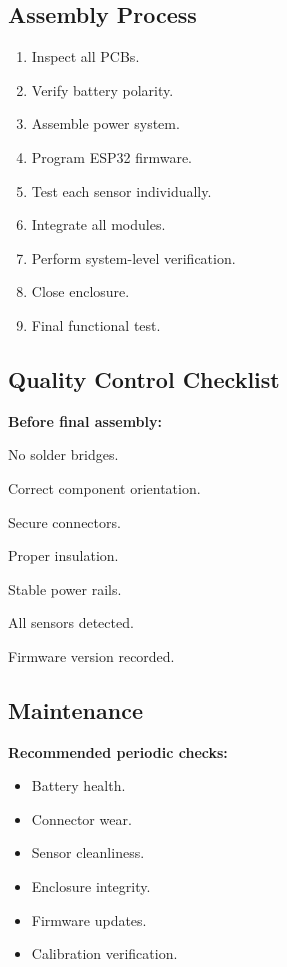 \subsection{Assembly Process}
\label{sec:assembly-process}

\begin{enumerate}
    \item Inspect all PCBs.
    \item Verify battery polarity.
    \item Assemble power system.
    \item Program ESP32 firmware.
    \item Test each sensor individually.
    \item Integrate all modules.
    \item Perform system-level verification.
    \item Close enclosure.
    \item Final functional test.
\end{enumerate}

\subsection{Quality Control Checklist}
\label{sec:qc-checklist}

\textbf{Before final assembly:}
\begin{checklist}
    \item No solder bridges.
    \item Correct component orientation.
    \item Secure connectors.
    \item Proper insulation.
    \item Stable power rails.
    \item All sensors detected.
    \item Firmware version recorded.
\end{checklist}

\subsection{Maintenance}
\label{sec:maintenance}

\textbf{Recommended periodic checks:}
\begin{itemize}
    \item Battery health.
    \item Connector wear.
    \item Sensor cleanliness.
    \item Enclosure integrity.
    \item Firmware updates.
    \item Calibration verification.
\end{itemize}

